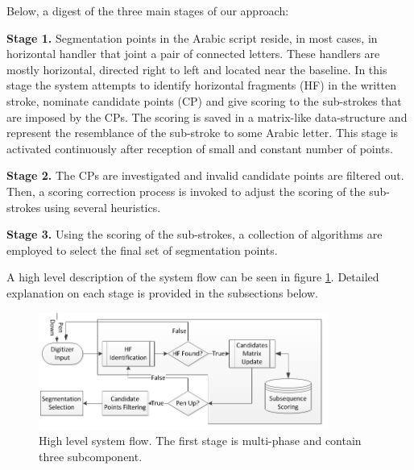 \documentclass[journal,compsoc]{IEEEtran}
\begin{document}
Below, a digest of the three main stages of our approach: 

\textbf{Stage 1.} Segmentation points in the Arabic script reside, in most cases, in horizontal handler that joint a pair of connected letters. These handlers are mostly horizontal, directed right to left and located near the baseline. In this stage the system attempts to identify horizontal fragments (HF) in the written stroke, nominate candidate points (CP) and give scoring to the sub-strokes that are imposed by the CPs. The scoring is saved in a matrix-like data-structure and represent the resemblance of the sub-stroke to some Arabic letter. This stage is activated continuously after reception of small and constant number of points. 

\textbf{Stage 2.} The CPs are investigated and invalid candidate points are filtered out. Then, a scoring correction process is invoked to adjust the scoring of the sub-strokes using several heuristics.

\textbf{Stage 3.} Using the scoring of the sub-strokes, a collection of algorithms are employed to select the final set of segmentation points.

A high level description of the system flow can be seen in figure \ref{fig:system_flow}. Detailed explanation on each stage is provided in the subsections below.

\begin{figure}
\centering
\includegraphics[width=9.5cm]{./figures/system_flow}
\caption{High level system flow. The first stage is multi-phase and contain three subcomponent. }
\label{fig:system_flow}
\end{figure}
\end{document}
